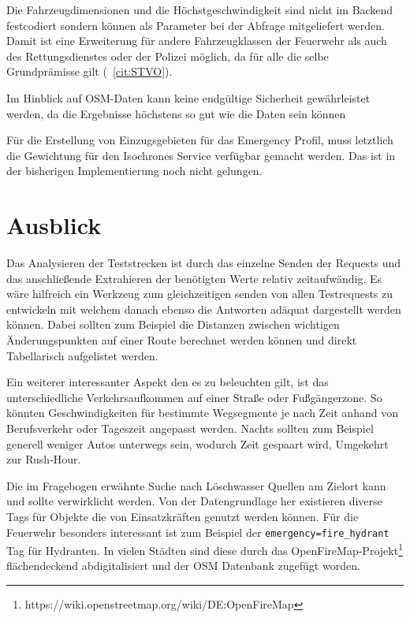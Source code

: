 Die Fahrzeugdimensionen und die Höchstgeschwindigkeit sind nicht im Backend festcodiert sondern können als Parameter bei der Abfrage mitgeliefert werden. Damit ist eine Erweiterung für andere Fahrzeugklassen der Feuerwehr als auch des Rettungsdienstes oder der Polizei möglich, da für alle die selbe Grundprämisse gilt (~\ref{cit:STVO}).

Im Hinblick auf OSM-Daten kann keine endgültige Sicherheit gewährleistet werden, da die Ergebnisse höchstens so gut wie die Daten sein können

Für die Erstellung von Einzugsgebieten für das Emergency Profil, muss letztlich die Gewichtung für den Isochrones Service verfügbar gemacht werden.
Das ist in der bisherigen Implementierung noch nicht gelungen.

\newpage
\section{Ausblick}


Das Analysieren der Teststrecken ist durch das einzelne Senden der Requests und das anschließende Extrahieren der benötigten Werte relativ zeitaufwändig. Es wäre hilfreich ein Werkzeug zum gleichzeitigen senden von allen Testrequests zu entwickeln mit welchem danach ebenso die Antworten adäquat dargestellt werden können. Dabei sollten zum Beispiel die Distanzen zwischen wichtigen Änderungspunkten auf einer Route berechnet werden können und direkt Tabellarisch aufgelistet werden.

Ein weiterer interessanter Aspekt den es zu beleuchten gilt, ist das unterschiedliche Verkehrsaufkommen auf einer Straße oder Fußgängerzone. So könnten Geschwindigkeiten für bestimmte Wegsegmente je nach Zeit anhand von Berufsverkehr oder Tageszeit angepasst werden. Nachts sollten zum Beispiel generell weniger Autos unterwegs sein, wodurch Zeit gespaart wird, Umgekehrt zur Rush-Hour.

Die im Fragebogen erwähnte Suche nach Löschwasser Quellen am Zielort kann und sollte verwirklicht werden. Von der Datengrundlage her existieren diverse Tags für Objekte die von Einsatzkräften genutzt werden können. Für die Feuerwehr besonders interessant ist zum Beispiel der \texttt{emergency=fire\_hydrant} Tag für Hydranten. In vielen Städten sind diese durch das OpenFireMap-Projekt\footnote{https://wiki.openstreetmap.org/wiki/DE:OpenFireMap} flächendeckend abdigitalisiert und der OSM Datenbank zugefügt worden.